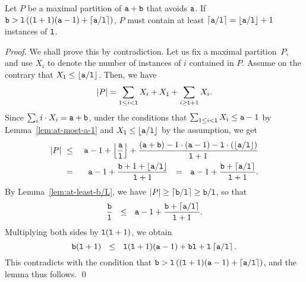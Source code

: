 \begin{lemma}  \label{lem:key-lemma}
Let $P$ be a maximal partition of $\pa + \pb$ that avoids $\pa$.
If $\pb > \pl\left((\pl+1)(\pa - 1) + \myceil{\pa/\pl}\right)$,
$P$ must contain at least $\myceil{\pa/\pl} = \myfloor{\pa/\pl} + 1$ instances of $\pl$.
\end{lemma}
\begin{proof} 
We shall prove this by contradiction.  Let us fix a maximal partition~$P$, and use $X_i$ to denote
the number of instances of $i$ contained in $P$.  
Assume on the contrary that $X_\pl \leq \myfloor{\pa/\pl}$.  Then, we have
\[
  |P| = \sum_{1\leq i < \pl}{X_i} + X_\pl +\sum_{i \geq \pl+1}{X_i}.
\]
Since $\sum_i {i \cdot X_i} = \pa+\pb$, under the conditions that  
$\sum_{1\leq i < \pl}{X_i} \leq \pa-1$ by Lemma~\ref{lem:at-most-a-1} and 
$X_\pl \leq \myfloor{\pa/\pl}$ by the assumption, we get
\begin{eqnarray*}
  |P|\ &\leq& \  
       \pa - 1 + \myfloor{\frac{\pa}{\pl}}   +  \frac{(\pa + \pb) - 1 \cdot (\pa-1) - \pl \cdot (\myfloor{\pa/\pl})}{\pl+1}\\
       &=& \  \pa - 1 + \frac{\pb  + 1 + \myfloor{\pa/\pl}}{\pl+1}\ \ =\ \ \pa - 1 + \frac{\pb + \myceil{\pa/\pl}}{\pl+1}.
\end{eqnarray*}  
By Lemma~\ref{lem:at-least-b/L}, we have $|P| \geq \myceil{\pb/\pl} \geq \pb/\pl$, so that
\[
  \frac{\pb}{\pl}\ \ \leq\ \ \pa - 1 + \frac{\pb + \myceil{\pa/\pl}}{\pl+1}.
\]
Multiplying both sides by $\pl(\pl+1)$, we obtain
\[
  \pb(\pl+1)\ \ \leq\ \ \pl(\pl+1)(\pa - 1) + \pb\pl + \pl\myceil{\pa/\pl}.
\]
This contradicts with the condition that $\pb > \pl \left((\pl+1)(\pa-1) + \myceil{\pa/\pl}\right)$, 
and the lemma thus follows.
\qed
\end{proof}

